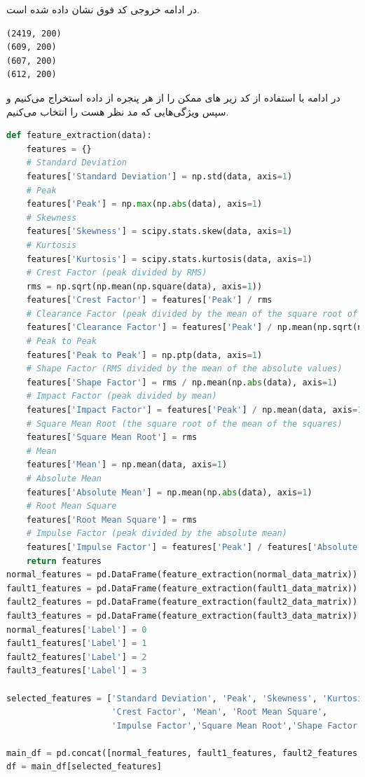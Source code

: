 \documentclass{article}
\begin{document}
در ادامه خروجی کد فوق نشان داده شده است.
\begin{LTR}
\begin{verbatim}
(2419, 200)
(609, 200)
(607, 200)
(612, 200)
\end{verbatim}
\end{LTR}

در ادامه با استفاده از کد زیر 
های
ممکن را از هر پنجره از داده استخراج می‌کنیم و سپس ویژگی‌هایی که مد نظر هست را انتخاب می‌کنیم.

\begin{LTR}
	\begin{lstlisting}[language=Python, caption=Feature Extraction and Feature Selection]
def feature_extraction(data):
    features = {}
    # Standard Deviation
    features['Standard Deviation'] = np.std(data, axis=1)
    # Peak
    features['Peak'] = np.max(np.abs(data), axis=1)
    # Skewness
    features['Skewness'] = scipy.stats.skew(data, axis=1)
    # Kurtosis
    features['Kurtosis'] = scipy.stats.kurtosis(data, axis=1)
    # Crest Factor (peak divided by RMS)
    rms = np.sqrt(np.mean(np.square(data), axis=1))
    features['Crest Factor'] = features['Peak'] / rms
    # Clearance Factor (peak divided by the mean of the square root of the absolute values)
    features['Clearance Factor'] = features['Peak'] / np.mean(np.sqrt(np.abs(data)), axis=1)
    # Peak to Peak
    features['Peak to Peak'] = np.ptp(data, axis=1)
    # Shape Factor (RMS divided by the mean of the absolute values)
    features['Shape Factor'] = rms / np.mean(np.abs(data), axis=1)
    # Impact Factor (peak divided by mean)
    features['Impact Factor'] = features['Peak'] / np.mean(data, axis=1)
    # Square Mean Root (the square root of the mean of the squares)
    features['Square Mean Root'] = rms
    # Mean
    features['Mean'] = np.mean(data, axis=1)
    # Absolute Mean
    features['Absolute Mean'] = np.mean(np.abs(data), axis=1)
    # Root Mean Square
    features['Root Mean Square'] = rms
    # Impulse Factor (peak divided by the absolute mean)
    features['Impulse Factor'] = features['Peak'] / features['Absolute Mean']
    return features
normal_features = pd.DataFrame(feature_extraction(normal_data_matrix))
fault1_features = pd.DataFrame(feature_extraction(fault1_data_matrix))
fault2_features = pd.DataFrame(feature_extraction(fault2_data_matrix))
fault3_features = pd.DataFrame(feature_extraction(fault3_data_matrix))
normal_features['Label'] = 0
fault1_features['Label'] = 1
fault2_features['Label'] = 2
fault3_features['Label'] = 3

selected_features = ['Standard Deviation', 'Peak', 'Skewness', 'Kurtosis',
                     'Crest Factor', 'Mean', 'Root Mean Square',
                     'Impulse Factor','Square Mean Root','Shape Factor','Label']

main_df = pd.concat([normal_features, fault1_features, fault2_features, fault3_features], ignore_index=True)
df = main_df[selected_features]
	\end{lstlisting}
\end{LTR}
\end{document}
